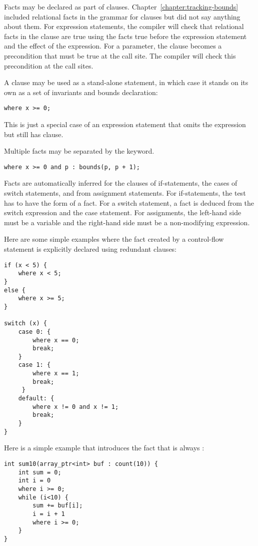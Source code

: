 Facts may be declared as part of  clauses.  
Chapter~\ref{chapter:tracking-bounds} included relational facts in
the grammar for  clauses but did not say
anything about them.  For expression statements, the compiler
will check that relational facts in the  clause are true 
using the facts true before the expression statement and the effect of
the expression. For a parameter, the  clause becomes a 
precondition that must be true at the call site. The compiler will check this
precondition at the call sites.

A  clause may be used as a stand-alone statement, 
in which case it stands on its own as a set of invariants and bounds
declaration:
\begin{lstlisting}
where x >= 0;
\end{lstlisting}
This is just a special case of an expression statement
that omits the expression but still has  clause.

Multiple facts may be separated by the  keyword.
\begin{lstlisting}
where x >= 0 and p : bounds(p, p + 1);
\end{lstlisting}

Facts are automatically inferred for the clauses of if-statements, 
the cases of switch statements, and from assignment statements. 
For if-statements, the test has to have
the form of a fact. For a switch statement, a fact is deduced from the
switch expression and the case statement.  For assignments, the
left-hand side must be a variable and the right-hand side must be
a non-modifying expression.

Here are some simple examples where the fact created by a control-flow
statement is explicitly declared using redundant  clauses:

\begin{lstlisting}
if (x < 5) {
    where x < 5;
}
else {
    where x >= 5;
} 

switch (x) {
    case 0: {
        where x == 0;
        break;
    }
    case 1: {
        where x == 1;
        break;
     }   
    default: {
        where x != 0 and x != 1;
        break;
    }
}
\end{lstlisting}

Here is a simple example that introduces the fact that  is always
:

\begin{lstlisting}
int sum10(array_ptr<int> buf : count(10)) {
    int sum = 0;
    int i = 0
    where i >= 0;
    while (i<10) {
        sum += buf[i];
        i = i + 1
        where i >= 0;
    }
}
\end{lstlisting}

